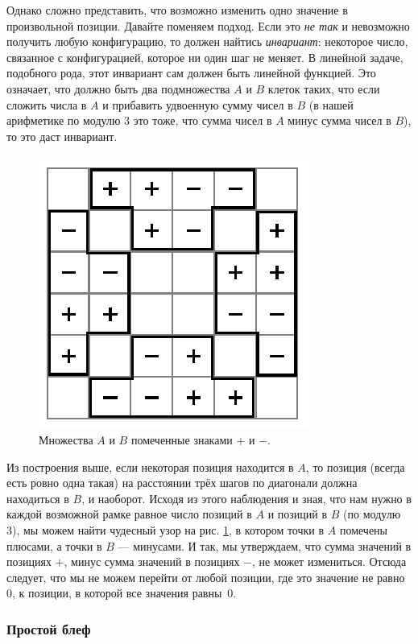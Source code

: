 Однако сложно представить, что возможно изменить одно значение в произвольной позиции.
Давайте поменяем подход.
Если это \emph{не так} и невозможно получить любую конфигурацию, то должен найтись \emph{инвариант}: некоторое число, связанное с конфигурацией, которое ни один шаг не меняет.
В линейной задаче, подобного рода, этот инвариант сам должен быть линейной функцией.
Это означает, что должно быть два подмножества $A$ и $B$ клеток таких, что если сложить числа в $A$ и прибавить удвоенную сумму чисел в $B$ (в нашей арифметике по модулю $3$ это тоже, что сумма чисел в $A$ минус сумма чисел в $B$), то это даст инвариант.

\begin{figure}[t!]
\centering
\includegraphics[scale=1]{pics/chess2}
\caption{Множества $A$ и $B$ помеченные знаками $+$ и $-$.}
\label{pic:chess2}
\end{figure}

Из построения выше, если некоторая позиция находится в $A$, то позиция (всегда есть ровно одна такая) на расстоянии трёх шагов по диагонали должна находиться в $B$, и наоборот.
Исходя из этого наблюдения и зная, что нам нужно в каждой возможной рамке равное число позиций в $A$ и позиций в $B$ (по модулю 3), мы можем найти чудесный узор на рис. \ref{pic:chess2}, в котором точки в $A$ помечены плюсами, а точки в $B$ --- минусами.
И так, мы утверждаем, что сумма значений в позициях $+$, минус сумма значений в позициях $-$, не может измениться.
Отсюда следует, что мы не можем перейти от любой позиции, где это значение не равно $0$, к позиции, в которой все значения равны~$0$.

\subsubsection*{Простой блеф}


